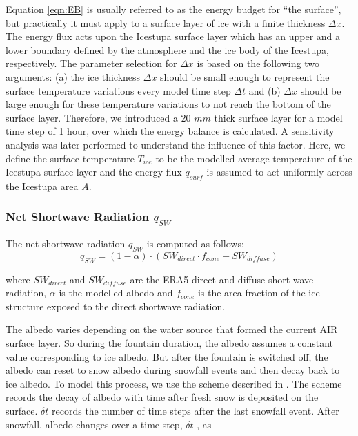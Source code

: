 \documentclass[utf8]{frontiersSCNS} %
\begin{document}
Equation \ref{eqn:EB} is usually referred to as the energy budget for “the surface”, but practically it must apply to
a surface layer of ice with a finite thickness $\Delta x$. The energy flux acts upon the Icestupa surface layer which
has an upper and a lower boundary defined by the atmosphere and the ice body of the Icestupa, respectively. The
parameter selection for $\Delta x$ is based on the following two arguments: (a) the ice thickness $\Delta x$ should be
small enough to represent the surface temperature variations every model time step $\Delta t$ and (b) $\Delta x$ should
be large enough for these temperature variations to not reach the bottom of the surface layer.  Therefore, we introduced
a 20 $mm$ thick surface layer for a model time step of 1 hour, over which the energy balance is calculated. A
sensitivity analysis was later performed to understand the influence of this factor. Here, we define the surface
temperature $T_{ice}$ to be the modelled average temperature of the Icestupa surface layer and the energy flux $q_{surf}$
is assumed to act uniformly across the Icestupa area $A$.

\subsubsection{Net Shortwave Radiation \texorpdfstring{$q_{SW}$}{Lg}} 
The net shortwave radiation $q_{SW}$ is computed as follows:
\begin{equation} q_{SW} = (1- \alpha)\cdot (SW_{direct} \cdot f_{cone} + SW_{diffuse}) \label{eqn:SW} \end{equation}

where $SW_{direct}$ and $SW_{diffuse}$ are the ERA5 direct and diffuse short wave radiation, $\alpha$ is the modelled
albedo and $f_{cone}$ is the area fraction of the ice structure exposed to the direct shortwave radiation.

The albedo varies depending on the water source that formed the current AIR surface layer. So during the fountain
duration, the albedo assumes a constant value corresponding to ice albedo. But after the fountain is switched off, the
albedo can reset to snow albedo during snowfall events and then decay back to ice albedo. To model this process, we use
the scheme described in \cite{OerlemansKnap_1998}. The scheme records the decay of albedo with time after fresh snow is
deposited on the surface. $\delta t$ records the number of time steps after the last snowfall event. After snowfall,
albedo changes over a time step, $\delta t$ , as
\end{document}
